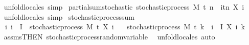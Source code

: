 \begin{isabellebody}
\isadelimproof
\ %
\endisadelimproof
%
\isatagproof
{}\isamarkupfalse%
\ {\isacharparenleft}{\kern0pt}unfold{\isacharunderscore}{\kern0pt}locales{\isacharparenright}{\kern0pt}\ simp%
\endisatagproof
{\isafoldproof}%
%
\isadelimproof
%
\endisadelimproof
\isanewline
\isanewline
{}\isamarkupfalse%
\ partial{\isacharunderscore}{\kern0pt}sum{\isacharprime}{\kern0pt}{\isacharunderscore}{\kern0pt}stochastic{\isacharcolon}{\kern0pt}\ {\isachardoublequoteopen}stochastic{\isacharunderscore}{\kern0pt}process\ M\ t\ {\isacharparenleft}{\kern0pt}{\isasymlambda}n\ {\isasymxi}{\isachardot}{\kern0pt}\ {\isasymSum}i{\isasymin}{\isacharbraceleft}{\kern0pt}tn{\isacharbraceright}{\kern0pt}{\isachardot}{\kern0pt}\ X\ i\ {\isasymxi}{\isacharparenright}{\kern0pt}{\isachardoublequoteclose}%
\isadelimproof
\ %
\endisadelimproof
%
\isatagproof
{}\isamarkupfalse%
\ {\isacharparenleft}{\kern0pt}unfold{\isacharunderscore}{\kern0pt}locales{\isacharparenright}{\kern0pt}\ simp%
\endisatagproof
{\isafoldproof}%
%
\isadelimproof
%
\endisadelimproof
\isanewline
\isanewline
{}\isamarkupfalse%
\isanewline
\isanewline
{}\isamarkupfalse%
\ stochastic{\isacharunderscore}{\kern0pt}process{\isacharunderscore}{\kern0pt}sum{\isacharcolon}{\kern0pt}\isanewline
\ \ \ {\isachardoublequoteopen}{\isasymAnd}i{\isachardot}{\kern0pt}\ i\ {\isasymin}\ I\ {\isasymLongrightarrow}\ stochastic{\isacharunderscore}{\kern0pt}process\ M\ t\ {\isacharparenleft}{\kern0pt}X\ i{\isacharparenright}{\kern0pt}{\isachardoublequoteclose}\isanewline
\ \ \ {\isachardoublequoteopen}stochastic{\isacharunderscore}{\kern0pt}process\ M\ t\ {\isacharparenleft}{\kern0pt}{\isasymlambda}k\ {\isasymxi}{\isachardot}{\kern0pt}\ {\isasymSum}i\ {\isasymin}\ I{\isachardot}{\kern0pt}\ X\ i\ k\ {\isasymxi}{\isacharparenright}{\kern0pt}{\isachardoublequoteclose}%
\isadelimproof
\ %
\endisadelimproof
%
\isatagproof
{}\isamarkupfalse%
\ assms{\isacharbrackleft}{\kern0pt}THEN\ stochastic{\isacharunderscore}{\kern0pt}process{\isachardot}{\kern0pt}random{\isacharunderscore}{\kern0pt}variable{\isacharbrackright}{\kern0pt}\ \isamarkupfalse%
\ {\isacharparenleft}{\kern0pt}unfold{\isacharunderscore}{\kern0pt}locales{\isacharcomma}{\kern0pt}\ auto{\isacharparenright}{\kern0pt}%
\endisatagproof
{\isafoldproof}%
%
\isadelimproof
%
\endisadelimproof

\end{isabellebody}
